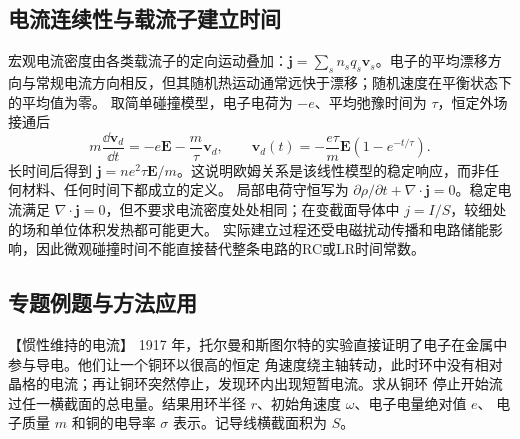 {\subsection{电流连续性与载流子建立时间}
宏观电流密度由各类载流子的定向运动叠加：$\boldsymbol j=\sum_s n_sq_s\boldsymbol v_s$。电子的平均漂移方向与常规电流方向相反，但其随机热运动通常远快于漂移；随机速度在平衡状态下的平均值为零。
取简单碰撞模型，电子电荷为 $-e$、平均弛豫时间为 $\tau$，恒定外场接通后
\[
 m\frac{\dd\boldsymbol v_d}{\dd t}=-e\boldsymbol E-\frac m\tau\boldsymbol v_d,
 \qquad\boldsymbol v_d(t)=-\frac{e\tau}{m}\boldsymbol E(1-e^{-t/\tau}).
\]
长时间后得到 $\boldsymbol j=ne^2\tau\boldsymbol E/m$。这说明欧姆关系是该线性模型的稳定响应，而非任何材料、任何时间下都成立的定义。
局部电荷守恒写为 $\partial\rho/\partial t+\nabla\cdot\boldsymbol j=0$。稳定电流满足 $\nabla\cdot\boldsymbol j=0$，但不要求电流密度处处相同；在变截面导体中 $j=I/S$，较细处的场和单位体积发热都可能更大。
实际建立过程还受电磁扰动传播和电路储能影响，因此微观碰撞时间不能直接替代整条电路的RC或LR时间常数。


\subsection{专题例题与方法应用}

\begin{origexamplebox}{【惯性维持的电流】}\label{ch21:ex:s36-5-1}
1917 年，托尔曼和斯图尔特的实验直接证明了电子在金属中参与导电。他们让一个铜环以很高的恒定
角速度绕主轴转动，此时环中没有相对晶格的电流；再让铜环突然停止，发现环内出现短暂电流。求从铜环
停止开始流过任一横截面的总电量。结果用环半径 $r$、初始角速度 $\omega$、电子电量绝对值 $e$、
电子质量 $m$ 和铜的电导率 $\sigma$ 表示。记导线横截面积为 $S$。

\begin{center}\begin{minipage}{.96\linewidth}\centering
{}
\end{minipage}\end{center}
\end{origexamplebox}
\begin{xesolution}\par\nopagebreak[4]


\end{xesolution}}
